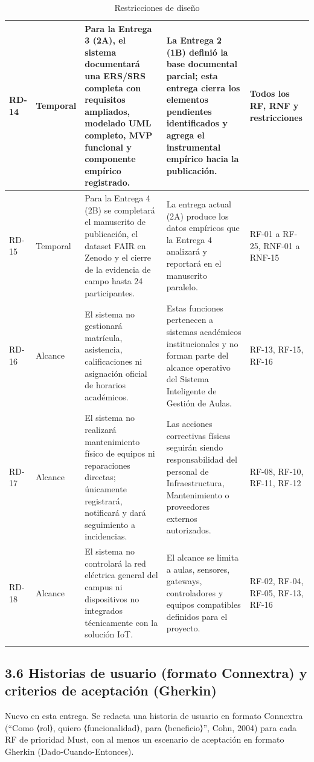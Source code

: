 \begin{longtable}{|p{3.1cm}|p{3.1cm}|p{3.1cm}|p{3.1cm}|p{3.1cm}|}
RD-14 & Temporal & Para la Entrega 3 (2A), el sistema documentará una ERS/SRS completa con requisitos ampliados, modelado UML completo, MVP funcional y componente empírico registrado. & La Entrega 2 (1B) definió la base documental parcial; esta entrega cierra los elementos pendientes identificados y agrega el instrumental empírico hacia la publicación. & Todos los RF, RNF y restricciones \\ \hline
RD-15 & Temporal & Para la Entrega 4 (2B) se completará el manuscrito de publicación, el dataset FAIR en Zenodo y el cierre de la evidencia de campo hasta 24 participantes. & La entrega actual (2A) produce los datos empíricos que la Entrega 4 analizará y reportará en el manuscrito paralelo. & RF-01 a RF-25, RNF-01 a RNF-15 \\ \hline
RD-16 & Alcance & El sistema no gestionará matrícula, asistencia, calificaciones ni asignación oficial de horarios académicos. & Estas funciones pertenecen a sistemas académicos institucionales y no forman parte del alcance operativo del Sistema Inteligente de Gestión de Aulas. & RF-13, RF-15, RF-16 \\ \hline
RD-17 & Alcance & El sistema no realizará mantenimiento físico de equipos ni reparaciones directas; únicamente registrará, notificará y dará seguimiento a incidencias. & Las acciones correctivas físicas seguirán siendo responsabilidad del personal de Infraestructura, Mantenimiento o proveedores externos autorizados. & RF-08, RF-10, RF-11, RF-12 \\ \hline
RD-18 & Alcance & El sistema no controlará la red eléctrica general del campus ni dispositivos no integrados técnicamente con la solución IoT. & El alcance se limita a aulas, sensores, gateways, controladores y equipos compatibles definidos para el proyecto. & RF-02, RF-04, RF-05, RF-13, RF-16 \\ \hline
\caption{Restricciones de diseño}
\end{longtable}
\endgroup

\subsection*{3.6 Historias de usuario (formato Connextra) y criterios de aceptación (Gherkin)}


Nuevo en esta entrega. Se redacta una historia de usuario en formato Connextra (``Como ⟨rol⟩, quiero ⟨funcionalidad⟩, para ⟨beneficio⟩'', Cohn, 2004) para cada RF de prioridad Must, con al menos un escenario de aceptación en formato Gherkin (Dado-Cuando-Entonces).


